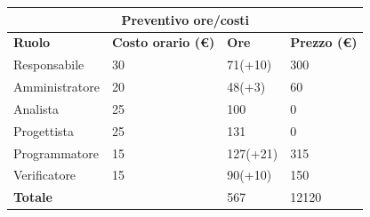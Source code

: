 \documentclass[a4paper, 12pt]{article}
\begin{document}
\begin{center}
	\begin{tabularx}{\textwidth}{|X|X|X|X|}
		\hline
		\multicolumn{4}{|c|}{\textbf{Preventivo ore/costi}}                                      \\
		\hline
		\hline
		\textbf{Ruolo}  & \textbf{Costo orario (\euro)} & \textbf{Ore} & \textbf{Prezzo (\euro)} \\
		\hline
		Responsabile    & 30                            & 71(+10)      & 300                     \\
		\hline
		Amministratore  & 20                            & 48(+3)       & 60                      \\
		\hline
		Analista        & 25                            & 100          & 0                       \\
		\hline
		Progettista     & 25                            & 131          & 0                       \\
		\hline
		Programmatore   & 15                            & 127(+21)     & 315                     \\
		\hline
		Verificatore    & 15                            & 90(+10)      & 150                     \\
		\hline
		\hline
		\textbf{Totale} &                               & 567          & 12120                   \\
		\hline
	\end{tabularx}\\[8pt]
	\mbox{}\\
\end{center}
\end{document}

